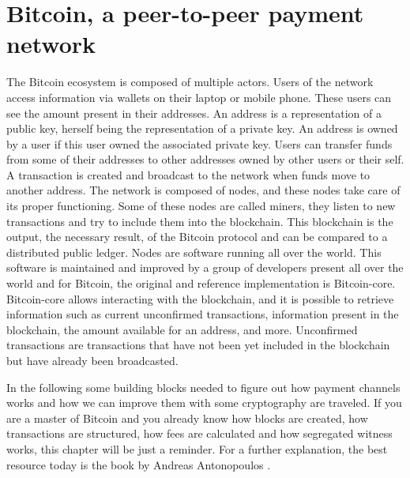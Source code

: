 \chapter{Bitcoin, a peer-to-peer payment network}
\label{chap:bitcoin}

The Bitcoin ecosystem is composed of multiple actors. Users of the network
access information via wallets on their laptop or mobile phone. These users can
see the amount present in their addresses. An address is a representation of a
public key, herself being the representation of a private key. An address is
owned by a user if this user owned the associated private key. Users can
transfer funds from some of their addresses to other addresses owned by other
users or their self. A transaction is created and broadcast to the network when
funds move to another address. The network is composed of nodes, and these nodes
take care of its proper functioning. Some of these nodes are called miners, they
listen to new transactions and try to include them into the blockchain. This
blockchain is the output, the necessary result, of the Bitcoin protocol and can
be compared to a distributed public ledger. Nodes are software running all over
the world. This software is maintained and improved by a group of developers
present all over the world and for Bitcoin, the original and reference
implementation is Bitcoin-core. Bitcoin-core allows interacting with the
blockchain, and it is possible to retrieve information such as current
unconfirmed transactions, information present in the blockchain, the amount
available for an address, and more. Unconfirmed transactions are transactions
that have not been yet included in the blockchain but have already been
broadcasted.

In the following some building blocks needed to figure out how payment channels
works and how we can improve them with some cryptography are traveled. If you
are a master of Bitcoin and you already know how blocks are created, how
transactions are structured, how fees are calculated and how segregated witness
works, this chapter will be just a reminder. For a further explanation, the best
resource today is the book  by Andreas Antonopoulos
\cite{Antonopoulos:2014:MBU:2695500}.


\minitoc

\newpage

